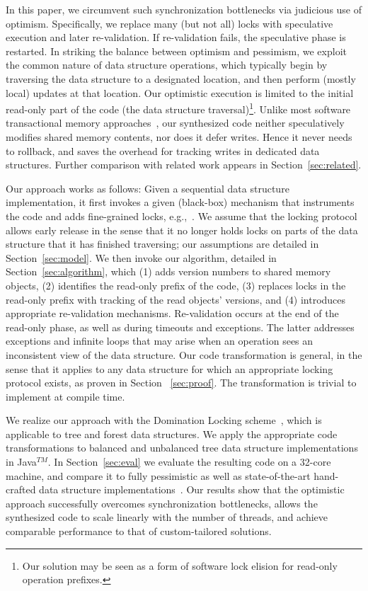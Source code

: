 In this paper, we circumvent such synchronization bottlenecks via judicious use of optimism. 
Specifically, we replace many (but not all) locks with speculative execution and later re-validation. 
If re-validation fails, the speculative phase is restarted. 
In striking the balance between optimism and pessimism, we exploit the common nature of data structure operations, 
which typically begin by traversing the data structure to a designated location, and then perform (mostly local) updates at that location. 
Our optimistic execution is limited to the initial read-only part of the code (the data structure traversal)\footnote{Our solution may be seen as a form of software lock elision for read-only operation prefixes.}. 
Unlike most software transactional memory approaches~\cite{stm,tls},  
our synthesized code neither speculatively modifies shared memory contents, nor does it defer writes. 
Hence it never needs to rollback, and saves the overhead for tracking writes in dedicated data structures. 
Further comparison with related work appears in Section~\ref{sec:related}.

Our approach works as follows: Given a sequential data structure implementation, 
it first invokes a given (black-box) mechanism that instruments the code and adds  
fine-grained locks, e.g.,~\cite{Gueta2011,SilberschatzK1980,dag}. We assume that the locking
protocol allows early release in the sense that it no longer holds locks on parts of the data structure that it has finished traversing; 
our assumptions are detailed in Section~\ref{sec:model}. We then invoke our algorithm, detailed in Section~\ref{sec:algorithm}, which 
(1) adds version numbers to shared memory objects, 
(2) identifies the read-only prefix of the code, 
(3) replaces locks in the read-only prefix with tracking of the read objects' versions, and 
(4) introduces appropriate re-validation mechanisms.  
Re-validation occurs at the end of the read-only phase, as well as during timeouts and exceptions. 
The latter addresses exceptions and infinite loops that may arise when an operation sees an inconsistent view of the data structure. 
Our code transformation is general, in the sense that it applies to any data structure for which an appropriate locking protocol exists, 
as proven in Section ~\ref{sec:proof}. The transformation is trivial to implement at compile time.

We realize our approach with the Domination Locking scheme~\cite{Gueta2011}, 
which is applicable to tree and forest data structures. 
We apply the appropriate code transformations to balanced and unbalanced tree data structure implementations in Java$^{TM}$. 
In Section~\ref{sec:eval} we evaluate the resulting code on a 32-core machine, 
and compare it to fully pessimistic as well as state-of-the-art hand-crafted
data structure implementations~\cite{DrachslerVY2014,BronsonCCO2010}.
Our results show that the optimistic approach successfully overcomes synchronization bottlenecks, 
allows the synthesized code to scale linearly with the number of threads, 
and achieve comparable performance to that of custom-tailored solutions.

